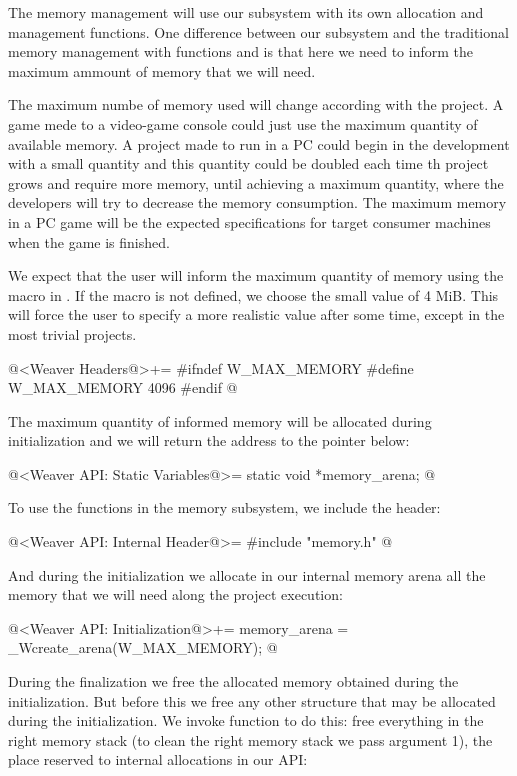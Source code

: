 
The memory management will use our subsystem with its own allocation
and management functions. One difference between our subsystem and the
traditional memory management with functions 
and  is that here we need to inform the maximum
ammount of memory that we will need.

The maximum numbe of memory used will change according with the
project. A game mede to a video-game console could just use the
maximum quantity of available memory. A project made to run in a PC
could begin in the development with a small quantity and this quantity
could be doubled each time th project grows and require more memory,
until achieving a maximum quantity, where the developers will try to
decrease the memory consumption. The maximum memory in a PC game will
be the expected specifications for target consumer machines when the
game is finished.

We expect that the user will inform the maximum quantity of memory
using the macro 
in . If the macro is not defined, we choose
the small value of 4 MiB. This will force the user to specify a more
realistic value after some time, except in the most trivial projects.

\iniciocodigo
@<Weaver Headers@>+=
#ifndef W_MAX_MEMORY
#define W_MAX_MEMORY 4096
#endif
@
\fimcodigo

The maximum quantity of informed memory will be allocated during
initialization and we will return the address to the pointer below:

\iniciocodigo
@<Weaver API: Static Variables@>=
static void *memory_arena;
@
\fimcodigo

To use the functions in the memory subsystem, we include the header:

\iniciocodigo
@<Weaver API: Internal Header@>=
#include "memory.h"
@
\fimcodigo

And during the initialization we allocate in our internal memory arena
all the memory that we will need along the project execution:

\iniciocodigo
@<Weaver API: Initialization@>+=
memory_arena = _Wcreate_arena(W_MAX_MEMORY);
@
\fimcodigo

During the finalization we free the allocated memory obtained during
the initialization. But before this we free any other structure that
may be allocated during the initialization. We invoke
function  to do this: free everything in the
right memory stack (to clean the right memory stack we pass argument
1), the place reserved to internal allocations in our API:

